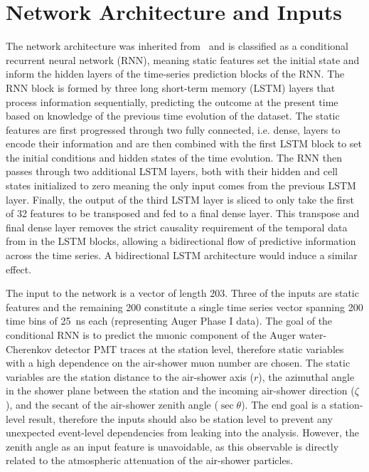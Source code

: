 

\section{Network Architecture and Inputs}\label{sec:architecture}
The network architecture was inherited from~\cite{auger_jinst2021_dnnmuons} and is classified as a conditional recurrent neural network (RNN), meaning static features set the initial state and inform the hidden layers of the time-series prediction blocks of the RNN.
The RNN block is formed by three long short-term memory (LSTM) layers that process information sequentially, predicting the outcome at the present time based on knowledge of the previous time evolution of the dataset.
The static features are first progressed through two fully connected, i.e. dense, layers to encode their information and are then combined with the first LSTM block to set the initial conditions and hidden states of the time evolution.
The RNN then passes through two additional LSTM layers, both with their hidden and cell states initialized to zero meaning the only input comes from the previous LSTM layer.
Finally, the output of the third LSTM layer is sliced to only take the first of 32 features to be transposed and fed to a final dense layer.
This transpose and final dense layer removes the strict causality requirement of the temporal data from in the LSTM blocks, allowing a bidirectional flow of predictive information across the time series.
A bidirectional LSTM architecture would induce a similar effect.


The input to the network is a vector of length 203.
Three of the inputs are static features and the remaining 200 constitute a single time series vector spanning 200 time bins of \qty{25}{\nano\second} each (representing Auger Phase I data).
The goal of the conditional RNN is to predict the muonic component of the Auger water-Cherenkov detector PMT traces at the station level, therefore static variables with a high dependence on the air-shower muon number are chosen.
The static variables are the station distance to the air-shower axis ($r$), the azimuthal angle in the shower plane between the station and the incoming air-shower direction ($\zeta$), and the secant of the air-shower zenith angle ($\sec\theta$).
The end goal is a station-level result, therefore the inputs should also be station level to prevent any unexpected event-level dependencies from leaking into the analysis.
However, the zenith angle as an input feature is unavoidable, as this observable is directly related to the atmospheric attenuation of the air-shower particles.

